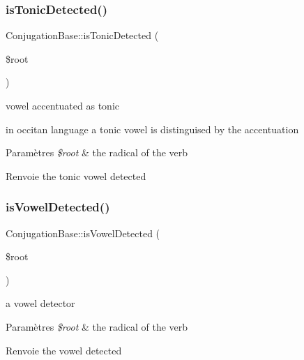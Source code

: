 \hypertarget{class_conjugation_base_a5fd0cc4d15523febc5eabfc41d8bdb21}{}\label{class_conjugation_base_a5fd0cc4d15523febc5eabfc41d8bdb21} 
\subsubsection{\texorpdfstring{is\+Tonic\+Detected()}{isTonicDetected()}}
{\footnotesize\ttfamily Conjugation\+Base\+::is\+Tonic\+Detected (\begin{DoxyParamCaption}\item[{}]{\$root }\end{DoxyParamCaption})\hspace{0.3cm}{\ttfamily [protected]}}



vowel accentuated as tonic 

in occitan language a tonic vowel is distinguised by the accentuation


\begin{DoxyParams}{Paramètres}
{\em \$root} & the radical of the verb \\
\hline
\end{DoxyParams}
\begin{DoxyReturn}{Renvoie}
the tonic vowel detected 
\end{DoxyReturn}
\hypertarget{class_conjugation_base_af8a92808eec27a866fe83fe64ba10784}{}\label{class_conjugation_base_af8a92808eec27a866fe83fe64ba10784} 
\subsubsection{\texorpdfstring{is\+Vowel\+Detected()}{isVowelDetected()}}
{\footnotesize\ttfamily Conjugation\+Base\+::is\+Vowel\+Detected (\begin{DoxyParamCaption}\item[{}]{\$root }\end{DoxyParamCaption})\hspace{0.3cm}{\ttfamily [protected]}}



a vowel detector 


\begin{DoxyParams}{Paramètres}
{\em \$root} & the radical of the verb \\
\hline
\end{DoxyParams}
\begin{DoxyReturn}{Renvoie}
the vowel detected 
\end{DoxyReturn}
\hypertarget{class_conjugation_base_aeaff0cedbe91b8a5cd534401d3b3ed74}{}\label{class_conjugation_base_aeaff0cedbe91b8a5cd534401d3b3ed74} 

